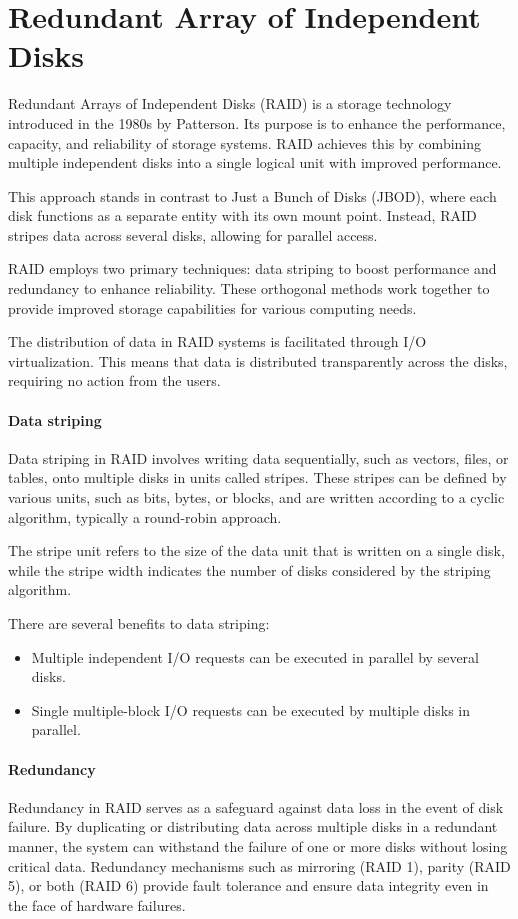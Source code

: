 \section{Redundant Array of Independent Disks}

Redundant Arrays of Independent Disks (RAID) is a storage technology introduced in the 1980s by Patterson. 
Its purpose is to enhance the performance, capacity, and reliability of storage systems. 
RAID achieves this by combining multiple independent disks into a single logical unit with improved performance.

This approach stands in contrast to Just a Bunch of Disks (JBOD), where each disk functions as a separate entity with its own mount point.
Instead, RAID stripes data across several disks, allowing for parallel access. 

RAID employs two primary techniques: data striping to boost performance and redundancy to enhance reliability. 
These orthogonal methods work together to provide improved storage capabilities for various computing needs.

The distribution of data in RAID systems is facilitated through I/O virtualization.
This means that data is distributed transparently across the disks, requiring no action from the users. 

\paragraph*{Data striping}
Data striping in RAID involves writing data sequentially, such as vectors, files, or tables, onto multiple disks in units called stripes. 
These stripes can be defined by various units, such as bits, bytes, or blocks, and are written according to a cyclic algorithm, typically a round-robin approach.

The stripe unit refers to the size of the data unit that is written on a single disk, while the stripe width indicates the number of disks considered by the striping algorithm.

There are several benefits to data striping:
\begin{itemize}
    \item Multiple independent I/O requests can be executed in parallel by several disks.
    \item Single multiple-block I/O requests can be executed by multiple disks in parallel.
\end{itemize}

\paragraph*{Redundancy}
Redundancy in RAID serves as a safeguard against data loss in the event of disk failure. 
By duplicating or distributing data across multiple disks in a redundant manner, the system can withstand the failure of one or more disks without losing critical data. 
Redundancy mechanisms such as mirroring (RAID 1), parity (RAID 5), or both (RAID 6) provide fault tolerance and ensure data integrity even in the face of hardware failures.

